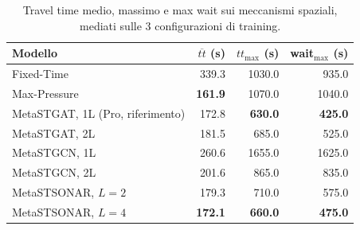 \begin{table}[htbp]
  \centering
  \begin{tabular}{@{}lrrr@{}}
    \toprule
    Modello                          & $\overline{tt}$ (s) & $tt_{\max}$ (s) & wait$_{\max}$ (s) \\
    \midrule
    Fixed-Time                       & 339.3               & 1030.0          & 935.0             \\
    Max-Pressure                     & \textbf{161.9}      & 1070.0          & 1040.0            \\
    MetaSTGAT, 1L (Pro, riferimento) & 172.8               & \textbf{630.0}  & \textbf{425.0}    \\
    MetaSTGAT, 2L                    & 181.5               & 685.0           & 525.0             \\
    MetaSTGCN, 1L                    & 260.6               & 1655.0          & 1625.0            \\
    MetaSTGCN, 2L                    & 201.6               & 865.0           & 835.0             \\
    MetaSTSONAR, $L{=}2$             & 179.3               & 710.0           & 575.0             \\
    MetaSTSONAR, $L{=}4$             & \textbf{172.1}      & \textbf{660.0}  & \textbf{475.0}    \\
    \bottomrule
  \end{tabular}
  \caption{Travel time medio, massimo e max wait sui
    meccanismi spaziali, mediati sulle 3 configurazioni di training.}
  \label{tab:architetture-train}
\end{table}

